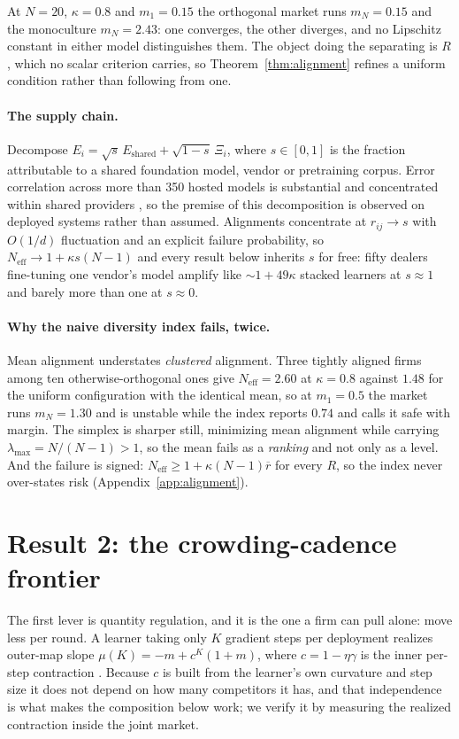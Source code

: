 \documentclass{article}
\theoremstyle{plain}
\theoremstyle{definition}
\newcommand{\Neff}{N_{\mathrm{eff}}}
\newcommand{\mN}{m_N}
\newcommand{\lmax}{\lambda_{\max}}
\begin{document}
At $N=20$, $\kappa=0.8$ and $m_1 = 0.15$ the orthogonal market runs $\mN = 0.15$ and the monoculture $\mN = 2.43$: one converges, the other diverges, and no Lipschitz constant in either model distinguishes them. The object doing the separating is $R$, which no scalar criterion carries, so Theorem~\ref{thm:alignment} refines a uniform condition rather than following from one.

\paragraph{The supply chain.}
Decompose $E_i = \sqrt{s}\,E_{\text{shared}} + \sqrt{1-s}\,\Xi_i$, where $s\in[0,1]$ is the fraction attributable to a shared foundation model, vendor or pretraining corpus. Error correlation across more than 350 hosted models is substantial and concentrated within shared providers \citep{kim2025}, so the premise of this decomposition is observed on deployed systems rather than assumed. Alignments concentrate at $r_{ij}\to s$ with $O(1/d)$ fluctuation and an explicit failure probability, so $\Neff \to 1 + \kappa s (N-1)$ and every result below inherits $s$ for free: fifty dealers fine-tuning one vendor's model amplify like ${\sim}1+49\kappa$ stacked learners at $s\approx 1$ and barely more than one at $s \approx 0$.

\paragraph{Why the naive diversity index fails, twice.}
Mean alignment understates \emph{clustered} alignment. Three tightly aligned firms among ten otherwise-orthogonal ones give $\Neff = 2.60$ at $\kappa = 0.8$ against $1.48$ for the uniform configuration with the identical mean, so at $m_1 = 0.5$ the market runs $\mN = 1.30$ and is unstable while the index reports $0.74$ and calls it safe with margin. The simplex is sharper still, minimizing mean alignment while carrying $\lmax = N/(N-1) > 1$, so the mean fails as a \emph{ranking} and not only as a level. And the failure is signed: $\Neff \geq 1 + \kappa(N-1)\overline{r}$ for every $R$, so the index never over-states risk (Appendix~\ref{app:alignment}).

\section{Result 2: the crowding-cadence frontier}
\label{sec:cadence}

The first lever is quantity regulation, and it is the one a firm can pull alone: move less per round. A learner taking only $K$ gradient steps per deployment realizes outer-map slope $\mu(K) = -m + c^K(1+m)$, where $c = 1-\eta\gamma$ is the inner per-step contraction \citep{mendlerdunner2020}. Because $c$ is built from the learner's own curvature and step size it does not depend on how many competitors it has, and that independence is what makes the composition below work; we verify it by measuring the realized contraction inside the joint market.
\end{document}
